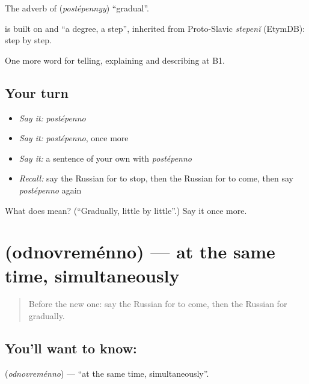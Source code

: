 The adverb of \emph{} (\emph{postépennyy}) \textquotedblleft{}gradual\textquotedblright{}.

\begin{cousinweb}
\emph{} is built on \emph{} and \emph{} \textquotedblleft{}a degree, a step\textquotedblright{}, inherited from Proto-Slavic \emph{stepenĭ} (EtymDB): step by step.
\end{cousinweb}

\begin{grammarlens}[title={What you've built}]
One more word for telling, explaining and describing at B1.
\end{grammarlens}

\subsection*{Your turn}
\begin{itemize}
\raggedright
  \item \emph{Say it:} \emph{postépenno}
  \item \emph{Say it:} \emph{postépenno}, once more
  \item \emph{Say it:} a sentence of your own with \emph{postépenno}
  \item \emph{Recall:} say the Russian for to stop, then the Russian for to come, then say \emph{postépenno} again
\end{itemize}

\begin{tcolorbox}[breakable,colback=teal!4,colframe=teal!35!black,title={Before you move on}]
What does  mean? (\textquotedblleft{}Gradually, little by little\textquotedblright{}.) Say it once more.
\end{tcolorbox}
\section[\texorpdfstring{\ru{одновременно} (odnovreménno)}{одновременно (odnovreménno)}]{ (odnovreménno) — at the same time, simultaneously}

\label{lesson:RU-C274-odnovremenno}



\begin{quote}
Before the new one: say the Russian for to come, then the Russian for gradually.
\end{quote}

\subsection*{You'll want to know: }
\textbf{} (\emph{odnovreménno}) — \textquotedblleft{}at the same time, simultaneously\textquotedblright{}.

